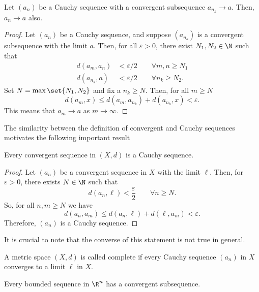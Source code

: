 \documentclass[draft]{penrose}
\begin{document}
\begin{nthm}
  Let $(a_n)$ be a Cauchy sequence with a convergent subsequence $a_{n_{k}} \to a$. Then, $a_n \to a$ also.
\end{nthm}
\begin{proof}
  Let $(a_n)$ be a Cauchy sequence, and suppose $(a_{n_{k}})$ is a convergent subsequence with the limit $a$. Then, for all $\varepsilon>0$, there exist $N_1, N_2 \in \N$ such that
  \begin{align*}
    d(a_m, a_n) &<\varepsilon/2 \qquad\forall m,n\geq N_1\\
    d(a_{n_{k}}, a) &<\varepsilon/2 \qquad\forall n_{k}\geq N_2.
  \end{align*}
  Set $N = \max\set{N_1, N_2}$ and fix a $n_k \geq N$. Then, for all $m \geq N$
  \begin{equation*}
    d(a_m, x) \leq d(a_m, a_{n_{k}}) + d(a_{n_{k}}, x)
    < \varepsilon.
  \end{equation*}
  This means that $a_m \to a$ as $m \to \infty$.
\end{proof}

The similarity between the definition of convergent and Cauchy sequences motivates the following important result
\begin{nthm}
  Every convergent sequence in $(X,d)$ is a Cauchy sequence.
\end{nthm}
\begin{proof}
  Let $(a_n)$ be a convergent sequence in $X$ with the limit $\ell$. Then, for $\varepsilon > 0$, there exists $N \in \N$ such that
  \begin{equation*}
    d(a_n, \ell) < \frac{\varepsilon}{2}
    \qquad\forall n \geq N.
  \end{equation*}
  So, for all $n,m \geq N$ we have
  \begin{equation*}
    d(a_n, a_m) \leq d(a_n, \ell) + d(\ell, a_m) < \varepsilon.
  \end{equation*}
  Therefore, $(a_n)$ is a Cauchy sequence.
\end{proof}
It is crucial to note that the converse of this statement is not true in general.

\begin{ndfn}
  A metric space $(X,d)$ is called complete if every Cauchy sequence $(a_n)$ in $X$ converges to a limit $\ell$ in $X$.
\end{ndfn}

\begin{nthm}
  Every bounded sequence in $\R^n$ has a convergent subsequence.
\end{nthm}
\end{document}
